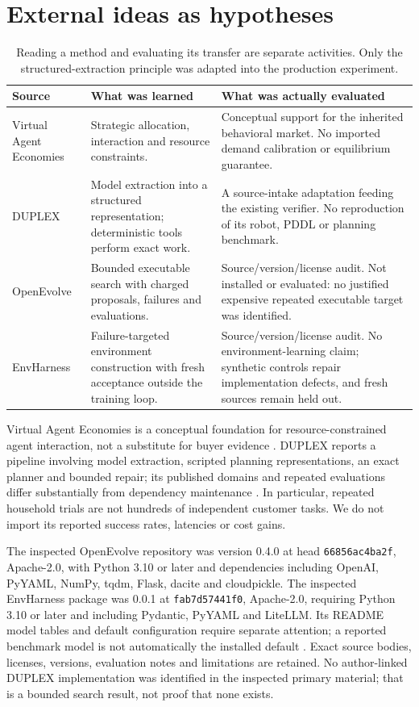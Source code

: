 \documentclass[11pt,a4paper]{article}
\begin{document}
\section{External ideas as hypotheses}
\begin{table}[htbp]
\centering\small
\begin{tabularx}{\textwidth}{p{25mm}XX}
\toprule
Source & What was learned & What was actually evaluated\\
\midrule
Virtual Agent Economies & Strategic allocation, interaction and resource constraints. & Conceptual support for the inherited behavioral market. No imported demand calibration or equilibrium guarantee.\\
DUPLEX & Model extraction into a structured representation; deterministic tools perform exact work. & A source-intake adaptation feeding the existing verifier. No reproduction of its robot, PDDL or planning benchmark.\\
OpenEvolve & Bounded executable search with charged proposals, failures and evaluations. & Source/version/license audit. Not installed or evaluated: no justified expensive repeated executable target was identified.\\
EnvHarness & Failure-targeted environment construction with fresh acceptance outside the training loop. & Source/version/license audit. No environment-learning claim; synthetic controls repair implementation defects, and fresh sources remain held out.\\
\bottomrule
\end{tabularx}
\caption{Reading a method and evaluating its transfer are separate activities. Only the structured-extraction principle was adapted into the production experiment.}
\end{table}

Virtual Agent Economies is a conceptual foundation for resource-constrained agent interaction, not a substitute for buyer evidence \cite{vae}. DUPLEX reports a pipeline involving model extraction, scripted planning representations, an exact planner and bounded repair; its published domains and repeated evaluations differ substantially from dependency maintenance \cite{duplex}. In particular, repeated household trials are not hundreds of independent customer tasks. We do not import its reported success rates, latencies or cost gains.

The inspected OpenEvolve repository was version 0.4.0 at head \texttt{66856ac4ba2f}, Apache-2.0, with Python 3.10 or later and dependencies including OpenAI, PyYAML, NumPy, tqdm, Flask, dacite and cloudpickle. The inspected EnvHarness package was 0.0.1 at \texttt{fab7d57441f0}, Apache-2.0, requiring Python 3.10 or later and including Pydantic, PyYAML and LiteLLM. Its README model tables and default configuration require separate attention; a reported benchmark model is not automatically the installed default \cite{openevolve,envharness}. Exact source bodies, licenses, versions, evaluation notes and limitations are retained. No author-linked DUPLEX implementation was identified in the inspected primary material; that is a bounded search result, not proof that none exists.
\end{document}
